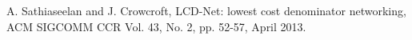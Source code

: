 \documentclass[conference]{IEEEtran}
\begin{document}
%
%
\begin{thebibliography}{15}








A. Sathiaseelan and J. Crowcroft, LCD-Net: lowest cost denominator networking, ACM SIGCOMM CCR Vol. 43, No. 2,  pp. 52-57, April 2013.








\end{thebibliography}
\end{document}
